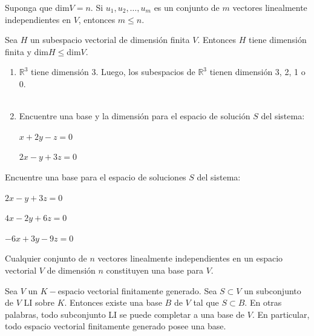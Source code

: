 \begin{thm}
Suponga que dim$V=n$. Si $u_1,u_2, \dots, u_m$ es un conjunto de $m$ vectores linealmente independientes en $V$, entonces $m \le n$.
\end{thm}

\begin{thm}
Sea $H$ un subespacio vectorial de dimensión finita $V$. Entonces $H$ tiene dimensión finita y dim$H \le$dim$V$.
\end{thm}

\begin{ejem}
\begin{enumerate}
\item
$\mathbb{R}^3$ tiene dimensi\'on 3. Luego, los subespacios de $\mathbb{R}^3$ tienen dimensi\'on 3, 2, 1 o 0.
\\\

\item
Encuentre una base y la dimensi\'on para el espacio de soluci\'on $S$ del sistema:
\begin{center}
    $x+2y-z=0$

$2x-y+3z=0$
\end{center}
\end{enumerate}
\end{ejem}





\begin{ejem}
Encuentre una base para el espacio de soluciones $S$ del sistema:
\begin{center}
    $2x-y+3z=0$

$4x-2y+6z=0$

$-6x+3y-9z=0$
\end{center}
\end{ejem}

\begin{thm}
Cualquier conjunto de $n$ vectores linealmente independientes en un espacio vectorial $V$ de dimensión $n$ constituyen una base para $V$.
\end{thm}

\begin{thm}
Sea $V$ un $K-$espacio vectorial finitamente generado. Sea
$S \subset V$ un subconjunto de $V$ LI sobre $K$. Entonces existe una base $B$ de $V$ tal que
$S \subset B$. En otras palabras, todo subconjunto LI se puede completar a una base de
$V $. En particular, todo espacio vectorial finitamente generado posee una base.
\end{thm}

